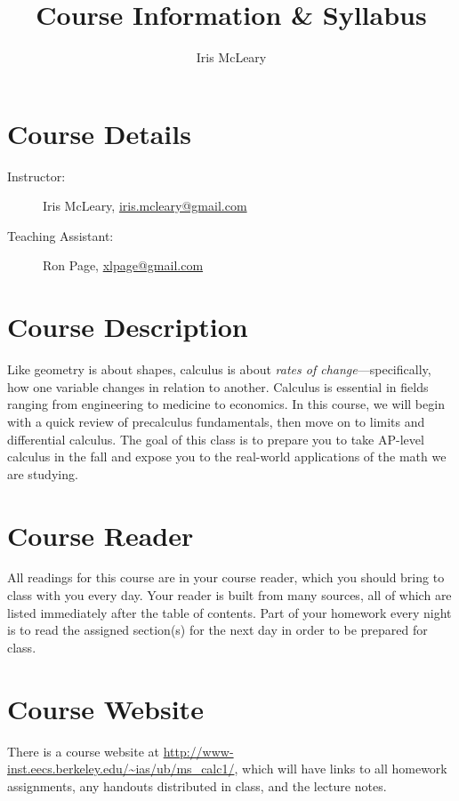 \documentclass[11pt]{article}
\begin{document}
\title{Course Information \& Syllabus}
\author{Iris McLeary}
\date{}
\maketitle
\thispagestyle{fancy}


\section{Course Details}

\begin{description}
\item[Instructor:] Iris McLeary, \href{mailto:iris.mcleary@gmail.com}{iris.mcleary@gmail.com}
\item[Teaching Assistant:] Ron Page, \href{mailto:xlpage@gmail.com}{xlpage@gmail.com}
\end{description}


\section{Course Description}

Like geometry is about shapes, calculus is about \emph{rates of change}---specifically, how one variable changes in relation to another. Calculus is essential in fields ranging from engineering to medicine to economics. In this course, we will begin with a quick review of precalculus fundamentals, then move on to limits and differential calculus. The goal of this class is to prepare you to take AP-level calculus in the fall and expose you to the real-world applications of the math we are studying.


\section{Course Reader}

All readings for this course are in your course reader, which you should bring to class with you every day. Your reader is built from many sources, all of which are listed immediately after the table of contents. Part of your homework every night is to read the assigned section(s) for the next day in order to be prepared for class.


\section{Course Website}

There is a course website at \href{http://www-inst.eecs.berkeley.edu/~ias/ub/ms_calc1/}{\url{http://www-inst.eecs.berkeley.edu/~ias/ub/ms_calc1/}}, which will have links to all homework assignments, any handouts distributed in class, and the lecture notes.
\end{document}
